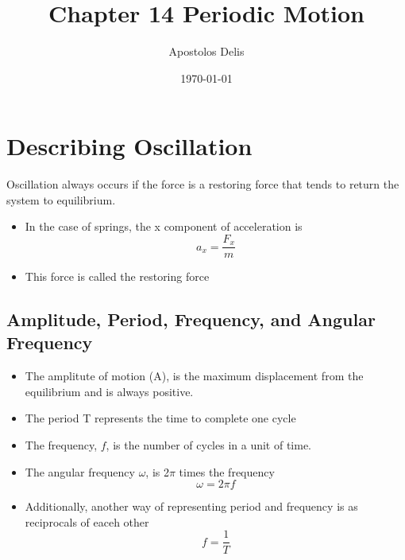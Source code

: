 \documentclass[11pt, a4paper]{article}
\begin{document}
\title{Chapter 14 Periodic Motion}
\author{Apostolos Delis}
\date{\today}
\maketitle

\tableofcontents
\section[14.1, Describing Oscillation]{Describing Oscillation}
Oscillation always occurs if the force is a restoring force that
tends to return the system to equilibrium.

\begin{itemize}
    \item In the case of springs, the x component of acceleration is
        \begin{equation*}
            a_x = \frac{F_x}{m}
        \end{equation*}
    \item This force is called the restoring force
\end{itemize}

\subsection{Amplitude, Period, Frequency, and Angular Frequency}
\begin{itemize}
    \item The amplitute of motion (A), is the maximum displacement from the
        equilibrium and is always positive.
    \item The period T represents the time to complete one cycle
    \item The frequency, $f$, is the number of cycles in a unit of time.
    \item The angular frequency $\omega$, is 2$\pi$ times the frequency
        \begin{equation}
        \omega = 2\pi f
        \end{equation}
    \item Additionally, another way of representing period and frequency is
        as reciprocals of eaceh other
        \begin{equation}
            f = \frac{1}{T}
        \end{equation}\break
\end{itemize}
\end{document}
